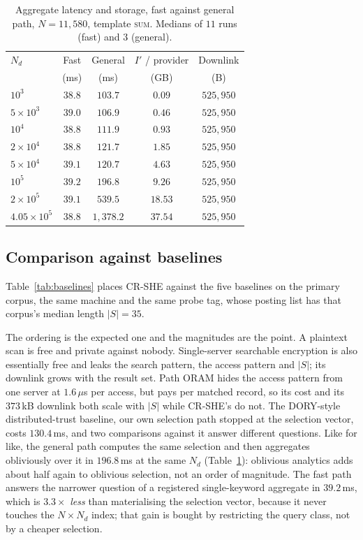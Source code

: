 \documentclass[a4paper,fleqn]{cas-dc}
\begin{document}
\begin{table}[pos=t]
\caption{Aggregate latency and storage, fast against general path,
$N=11{,}580$, template \textsc{sum}. Medians of $11$ runs (fast) and $3$
(general).}
\label{tab:compute}
\centering
\footnotesize
\setlength{\tabcolsep}{3pt}
\renewcommand{\arraystretch}{1.2}
\begin{tabular*}{\tblwidth}{@{\extracolsep{\fill}}lcccc@{}}
\toprule
$N_d$ & Fast & General & $I'$ / provider & Downlink \\
      & (ms) & (ms)     & (GB)            & (B) \\
\midrule
$10^3$             & $38.8$ & $103.7$   & $0.09$  & $525{,}950$ \\
$5\times10^3$      & $39.0$ & $106.9$   & $0.46$  & $525{,}950$ \\
$10^4$             & $38.8$ & $111.9$   & $0.93$  & $525{,}950$ \\
$2\times10^4$      & $38.8$ & $121.7$   & $1.85$  & $525{,}950$ \\
$5\times10^4$      & $39.1$ & $120.7$   & $4.63$  & $525{,}950$ \\
$10^5$             & $39.2$ & $196.8$   & $9.26$  & $525{,}950$ \\
$2\times10^5$      & $39.1$ & $539.5$   & $18.53$ & $525{,}950$ \\
$4.05\times10^5$   & $38.8$ & $1{,}378.2$ & $37.54$ & $525{,}950$ \\
\bottomrule
\end{tabular*}
\end{table}

\subsection{Comparison against baselines}
Table~\ref{tab:baselines} places CR-SHE against the five baselines on the
primary corpus, the same machine and the same probe tag, whose posting list
has that corpus's median length $|S|=35$.

The ordering is the expected one and the magnitudes are the point. A plaintext
scan is free and private against nobody. Single-server searchable encryption
is also essentially free and leaks the search pattern, the access pattern and
$|S|$; its downlink grows with the result set. Path ORAM hides the access
pattern from one server at $1.6\,\mu$s per access, but pays per matched
record, so its cost and its $373$\,kB downlink both scale with $|S|$ while
CR-SHE's do not. The DORY-style distributed-trust baseline, our own selection
path stopped at the selection vector, costs $130.4$\,ms, and two comparisons
against it answer different questions. Like for like, the general path
computes the same selection and then aggregates obliviously over it in
$196.8$\,ms at the same $N_d$ (Table~\ref{tab:compute}): oblivious analytics
adds about half again to oblivious selection, not an order of magnitude. The
fast path answers the narrower question of a registered single-keyword
aggregate in $39.2$\,ms, which is $3.3\times$ \emph{less} than materialising
the selection vector, because it never touches the $N\times N_d$ index; that
gain is bought by restricting the query class, not by a cheaper selection.
\end{document}

